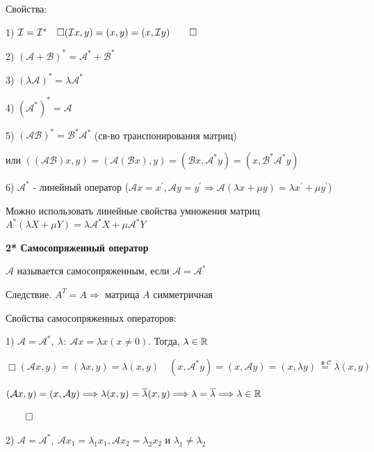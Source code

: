 \documentclass[12pt]{article}
\begin{document}
    \hypertarget{conjugateoperatorproperties}{}

    Свойства:

    1) $\mathcal{I} = \mathcal{I}^* \quad \Box (\mathcal{I}x, y) = (x, y) = (x, \mathcal{I}y) \qed$

    2) $(\mathcal{A} + \mathcal{B})^* = \mathcal{A}^* + \mathcal{B}^*$

    3) $(\lambda \mathcal{A})^* = \lambda \mathcal{A}^*$

    4) $(\mathcal{A}^*)^* = \mathcal{A}$

    5) $(\mathcal{A}\mathcal{B})^* = \mathcal{B}^* \mathcal{A}^*$ (св-во транспонирования матриц)

    или $((\mathcal{AB})x, y) = (\mathcal{A}(\mathcal{B}x), y) = (\mathcal{B}x, \mathcal{A}^* y) = (x, \mathcal{B}^* \mathcal{A}^* y)$

    6) $\mathcal{A}^*$ - линейный оператор ($\mathcal{A}x = x^\prime, \mathcal{A}y = y^\prime \Longrightarrow \mathcal{A}(\lambda x + \mu y) = \lambda x^\prime + \mu y^\prime$)

    Можно использовать линейные свойства умножения матриц $A^* (\lambda X + \mu Y) = \lambda \mathcal{A}^* X + \mu \mathcal{A}^* Y$

    \hypertarget{selfconjugateoperator}{}

    \textbf{2* Самосопряженный оператор}

    \Def $\mathcal{A}$ называется самосопряженным, если $\mathcal{A} = \mathcal{A}^*$

    Следствие. $A^T = A \Longrightarrow$ матрица $A$ симметричная

    \hypertarget{selfconjugateoperatorproperties}{}

    Свойства самосопряженных операторов:

    1) $\mathcal{A} = \mathcal{A}^*, \ \lambda : \ \mathcal{A}x = \lambda x (x \neq 0)$. Тогда, $\lambda \in \mathbb{R}$

    $\Box (\mathcal{A}x, y) = (\lambda x, y) = \lambda (x, y) \quad (x, \mathcal{A}^* y) = (x, \mathcal{A}y) = (x, \lambda y) \stackrel{\text{ в } \mathcal{C}}{=} \overline{\lambda} (x, y)$

    $(\mathcal{A}x, y) = (x, \mathcal{A}y) \Longrightarrow \lambda (x, y) = \overline{\lambda} (x, y) \Longrightarrow \lambda = \overline{\lambda} \Longrightarrow \lambda \in \mathbb{R}$

    $\qed$

    2) $\mathcal{A} = \mathcal{A}^*, \ \mathcal{A}x_1 = \lambda_1 x_1, \mathcal{A}x_2 = \lambda_2 x_2$ и $\lambda_1 \neq \lambda_2$
\end{document}
